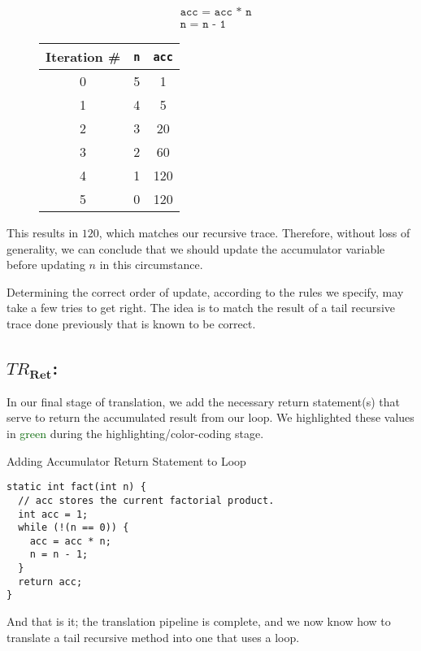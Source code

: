 \begin{figure}[H]
\centering
\begin{minipage}{.4\textwidth}
  \begin{align*}
  &\texttt{acc = acc * n}\\
  &\texttt{n = n - 1}
  \end{align*}
\end{minipage}%
\begin{minipage}{.4\textwidth}
\begin{tabular}{c|c|c}
Iteration \# & \texttt{n} & \texttt{acc}\\
\hline
\hline
0 & 5 & 1\\
\hline
1 & 4 & 5\\
\hline
2 & 3 & 20\\
\hline
3 & 2 & 60\\
\hline
4 & 1 & 120\\
\hline
5 & 0 & 120\\
\end{tabular}
\end{minipage}
\end{figure}
This results in $120$, which matches our recursive trace. Therefore, without loss of generality, we can conclude that we should update the accumulator variable before updating $n$ in this circumstance.

Determining the correct order of update, according to the rules we specify, may take a few tries to get right. The idea is to match the result of a tail recursive trace done previously that is known to be correct.

\subsection*{\textit{$TR_\mathbf{Ret}$}:}
In our final stage of translation, we add the necessary return statement(s) that serve to return the accumulated result from our loop. We highlighted these values in \textcolor{darkgreen}{green} during the highlighting/color-coding stage.
\begin{cl}[]{Adding Accumulator Return Statement to Loop}
\begin{lstlisting}[language=MyJava]
static int fact(int n) {
  // acc stores the current factorial product. 
  int acc = 1;
  while (!(n == 0)) { 
    acc = acc * n;
    n = n - 1;
  }
  return acc;
}
\end{lstlisting}
\end{cl}

And that is it; the translation pipeline is complete, and we now know how to translate a tail recursive method into one that uses a loop.

